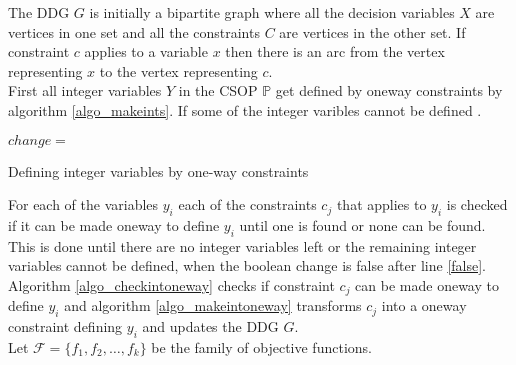 The DDG $G$ is initially a bipartite graph where all the decision variables $X$ are vertices in one set and all the 
constraints $C$ are vertices in the other set. If constraint $c$ applies to a variable $x$ then there is an arc from 
the vertex representing $x$ to the vertex representing $c$. \\    
First all integer variables $Y$ in the CSOP $\mathbb{P}$  get 
defined by oneway constraints by algorithm 
\ref{algo_makeints}. If some of the integer varibles cannot be defined . 
\\
\IncMargin{1em}
\begin{algorithm}[H]
\algdata 
{}
\BlankLine
\Bool $change = $ \true\;
\caption{Defining integer variables by one-way constraints}\label{algo_makeints}
\end{algorithm}\DecMargin{1em}
\noindent
For each of the variables $y_i$ each of the constraints $c_j$ that applies to $y_i$ is checked if it can be made oneway 
to define $y_i$ until one is found or none can be found. This is done until there are no integer variables left or the 
remaining integer variables cannot be defined, when the boolean change is false after line \ref{false}. Algorithm 
\ref{algo_checkintoneway} checks if constraint $c_j$ can be made oneway to define $y_i$ and algorithm 
\ref{algo_makeintoneway} transforms $c_j$ into a oneway constraint defining $y_i$ and updates the DDG $G$. \\
Let $\mathcal{F} = \{f_1,f_2,\dots ,f_k\}$ be the family of objective functions. \\
\IncMargin{1em}

